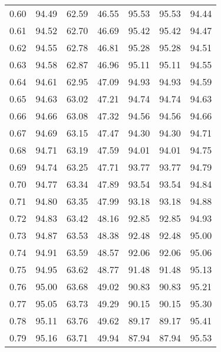 \begin{tabular}{|c|c|c|c|c|c|c|}
      0.60 &     94.49 &     62.59 &      46.55 &   95.53 &      95.53 &         94.44 \\
      0.61 &     94.52 &     62.70 &      46.69 &   95.42 &      95.42 &         94.47 \\
      0.62 &     94.55 &     62.78 &      46.81 &   95.28 &      95.28 &         94.51 \\
      0.63 &     94.58 &     62.87 &      46.96 &   95.11 &      95.11 &         94.55 \\
      0.64 &     94.61 &     62.95 &      47.09 &   94.93 &      94.93 &         94.59 \\
      0.65 &     94.63 &     63.02 &      47.21 &   94.74 &      94.74 &         94.63 \\
      0.66 &     94.66 &     63.08 &      47.32 &   94.56 &      94.56 &         94.66 \\
      0.67 &     94.69 &     63.15 &      47.47 &   94.30 &      94.30 &         94.71 \\
      0.68 &     94.71 &     63.19 &      47.59 &   94.01 &      94.01 &         94.75 \\
      0.69 &     94.74 &     63.25 &      47.71 &   93.77 &      93.77 &         94.79 \\
      0.70 &     94.77 &     63.34 &      47.89 &   93.54 &      93.54 &         94.84 \\
      0.71 &     94.80 &     63.35 &      47.99 &   93.18 &      93.18 &         94.88 \\
      0.72 &     94.83 &     63.42 &      48.16 &   92.85 &      92.85 &         94.93 \\
      0.73 &     94.87 &     63.53 &      48.38 &   92.48 &      92.48 &         95.00 \\
      0.74 &     94.91 &     63.59 &      48.57 &   92.06 &      92.06 &         95.06 \\
      0.75 &     94.95 &     63.62 &      48.77 &   91.48 &      91.48 &         95.13 \\
      0.76 &     95.00 &     63.68 &      49.02 &   90.83 &      90.83 &         95.21 \\
      0.77 &     95.05 &     63.73 &      49.29 &   90.15 &      90.15 &         95.30 \\
      0.78 &     95.11 &     63.76 &      49.62 &   89.17 &      89.17 &         95.41 \\
      0.79 &     95.16 &     63.71 &      49.94 &   87.94 &      87.94 &         95.53 \\

\end{tabular}
